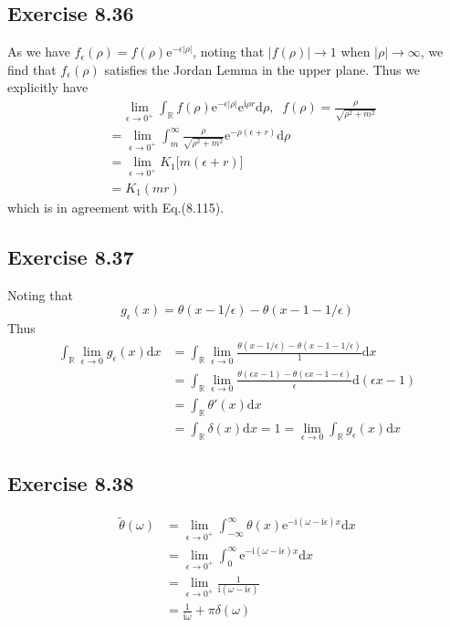 \documentclass[]{ctexart}
\begin{document}
		\subsection{Exercise 8.36}
		As we have $f_\epsilon(\rho)=f(\rho)\mathrm{e}^{-\epsilon|\rho|}$, noting that $|f(\rho)|\to 1$ when $|\rho|\to\infty$, we find that $f_\epsilon(\rho)$ 
		satisfies the Jordan Lemma in the upper plane. Thus we explicitly have 
		\begin{align*}
		&\;\;\;\;\lim_{\epsilon\to 0^+}\int_{\mathbb R}f(\rho)\mathrm{e}^{-\epsilon|\rho|}\mathrm{e}^{\mathrm{i}\rho r}\mathrm{d}\rho,\;\;f(\rho)=\frac{\rho}{\sqrt{\rho^2+m^2}}\\
		&=\lim_{\epsilon\to 0^+}\int_m^\infty\frac{\rho}{\sqrt{\rho^2+m^2}}\mathrm{e}^{-\rho(\epsilon+r)}\mathrm{d}\rho\\
		&=\lim_{\epsilon\to 0^+} K_1\big[m(\epsilon+r)\big]\\
		&=K_1(mr)
		\end{align*}
		which is in agreement with Eq.(8.115). 
		
		\subsection{Exercise 8.37}
		Noting that 
		\begin{equation*}
		g_\epsilon(x)=\theta(x-1/\epsilon)-\theta(x-1-1/\epsilon)
		\end{equation*}
		Thus 
		\begin{align*}
		\int_{\mathbb R}\lim_{\epsilon\to 0}g_\epsilon(x)\mathrm{d}x&=\int_{\mathbb R}\lim_{\epsilon\to 0}\frac{\theta(x-1/\epsilon)-\theta(x-1-1/\epsilon)}{1}\mathrm{d}x\\
		&=\int_{\mathbb R}\lim_{\epsilon\to 0}\frac{\theta(\epsilon x-1)-\theta(\epsilon x-1-\epsilon)}{\epsilon}\mathrm{d}(\epsilon x-1)\\
		&=\int_{\mathbb R}\theta'(x)\mathrm{d}x\\
		&=\int_{\mathbb R}\delta(x)\mathrm{d}x=1=\lim_{\epsilon\to 0}\int_\mathbb R g_\epsilon(x)\mathrm{d}x
		\end{align*}
		
		
		\subsection{Exercise 8.38}
		\begin{align*}
		\tilde{\theta}(\omega)&=\lim_{\epsilon\to 0^+}\int_{-\infty}^\infty\theta(x)\mathrm{e}^{-\mathrm{i}(\omega-\mathrm{i}\epsilon)x}\mathrm{d}x\\
		&=\lim_{\epsilon\to 0^+}\int_0^\infty\mathrm{e}^{-\mathrm{i}(\omega-\mathrm{i}\epsilon)x}\mathrm{d}x\\
		&=\lim_{\epsilon\to 0^+}\frac{1}{\mathrm{i}(\omega-\mathrm{i}\epsilon)}\\
		&=\frac{1}{\mathrm{i}\omega}+\pi\delta(\omega)
		\end{align*}
\end{document}
